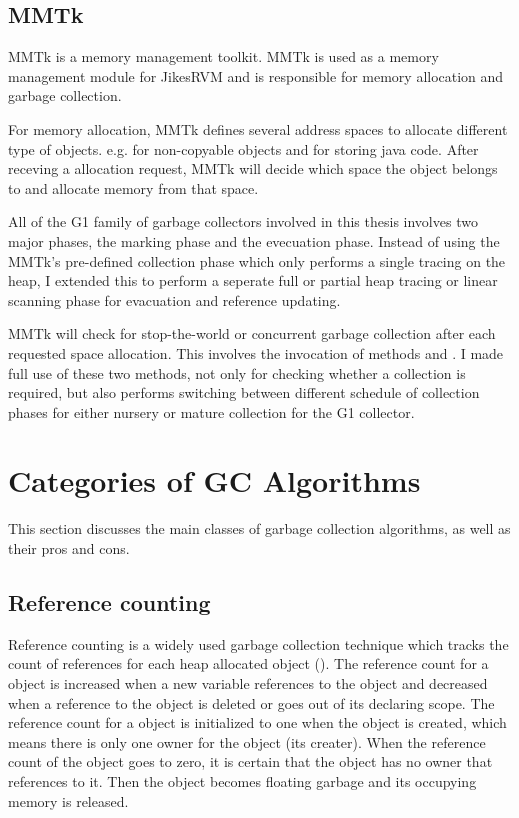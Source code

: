 \subsection{MMTk}

MMTk is a memory management toolkit.
MMTk is used as a memory management module for JikesRVM and is responsible for
memory allocation and garbage collection.

For memory allocation, MMTk defines several address spaces to
allocate different type of objects. e.g.  for non-copyable objects
and  for storing java code. After receving a allocation request,
MMTk will decide which space the object belongs to and allocate memory from that space.

All of the G1 family of garbage collectors involved in this thesis involves two major phases,
the marking phase and the evecuation phase.
Instead of using the MMTk's pre-defined 
collection phase which only performs a single tracing on the heap, I extended this
to perform a seperate full or partial heap tracing or linear scanning phase for
evacuation and reference updating.

MMTk will check for stop-the-world or concurrent garbage collection after each
requested space allocation.
This involves the invocation of methods 
and .
I made full use of these two methods,
not only for checking whether a collection is required,
but also performs switching between different schedule of collection phases
for either nursery or mature collection for the G1 collector.

\section{Categories of GC Algorithms}
\label{sec:gcalgorithms}

This section discusses the main classes of garbage collection algorithms, as well
as their pros and cons.

\subsection{Reference counting}

Reference counting is a widely used garbage collection technique which tracks the
count of references for each heap allocated object (\cite{detlefs2002lock}).
The reference count for a object is increased when a new variable references to
the object and decreased when a reference
to the object is deleted or goes out of its declaring scope. The reference count for
a object is initialized to one when the object is created, which means there is only one
owner for the object (its creater). When the reference count of the object goes
to zero, it is certain that the object has no owner that references to it. Then the
object becomes floating garbage and its occupying memory is released.

